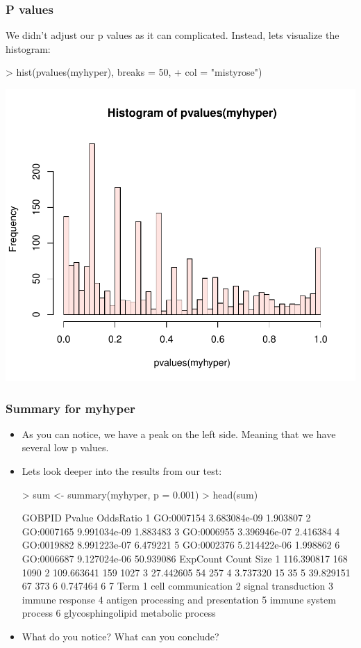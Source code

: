 \begin{frame}
  \frametitle{P values}
  We didn't adjust our p values as it can complicated. Instead, lets visualize the histogram:
\begin{Schunk}
\begin{Sinput}
> hist(pvalues(myhyper), breaks = 50, 
+     col = "mistyrose")
\end{Sinput}
\end{Schunk}
\includegraphics{plots/fig-036}
\end{frame}

\begin{frame}
  \frametitle{Summary for myhyper}
  \begin{itemize}
  \item As you can notice, we have a peak on the left side. Meaning that we have several low p values.
  \item Lets look deeper into the results from our test: \scriptsize
\begin{Schunk}
\begin{Sinput}
> sum <- summary(myhyper, p = 0.001)
> head(sum)
\end{Sinput}
\begin{Soutput}
      GOBPID       Pvalue OddsRatio
1 GO:0007154 3.683084e-09  1.903807
2 GO:0007165 9.991034e-09  1.883483
3 GO:0006955 3.396946e-07  2.416384
4 GO:0019882 8.991223e-07  6.479221
5 GO:0002376 5.214422e-06  1.998862
6 GO:0006687 9.127024e-06 50.939086
    ExpCount Count Size
1 116.390817   168 1090
2 109.663641   159 1027
3  27.442605    54  257
4   3.737320    15   35
5  39.829151    67  373
6   0.747464     6    7
                                 Term
1                  cell communication
2                 signal transduction
3                     immune response
4 antigen processing and presentation
5               immune system process
6 glycosphingolipid metabolic process
\end{Soutput}
\end{Schunk}
  \normalsize
  \item What do you notice? What can you conclude?
  \end{itemize}
\end{frame}

